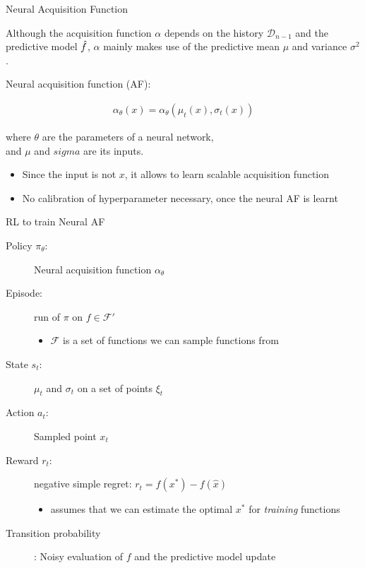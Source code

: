 \begin{frame}[c]{Neural Acquisition Function }

Although the \alert{acquisition function $\alpha$} depends on the history $\mathcal{D}_{n-1}$ and the predictive model $\hat{f}$, $\alpha$ mainly makes use of the \alert{predictive mean $\mu$ and variance $\sigma^2$}.

\pause
\bigskip

Neural acquisition function (AF):

\begin{eqnarray}
\alpha_\theta(x) = \alpha_\theta(\mu_t(x), \sigma_t(x)) \nonumber
\end{eqnarray}

where $\theta$ are the parameters of a neural network,\\ and $\mu$ and $sigma$ are its inputs.

\pause 
\begin{itemize}
\item Since the input is not $x$, it allows to learn scalable acquisition function
\item No calibration of hyperparameter necessary, once the neural AF is learnt
\end{itemize}

\end{frame}
\begin{frame}[c]{RL to train Neural AF }

\begin{description}
\item[Policy $\pi_\theta$:] Neural acquisition function $\alpha_\theta$
\pause
\item[Episode:] run of $\pi$ on $f\in \mathcal{F}'$
\begin{itemize}
\item $\mathcal{F}$ is a set of functions we can sample functions from
\end{itemize}
\pause
\item[State $s_t$:] $\mu_t$ and $\sigma_t$ on a set of points $\xi_t$
\pause
\item[Action $a_t$:] Sampled point $x_t$
\pause
\item[Reward $r_t$:] negative simple regret: $r_t = f(x^*) - f(\hat{x})$
\begin{itemize}
\item assumes that we can estimate the optimal $x^*$ for \emph{training} functions
\end{itemize}
\pause
\item[Transition probability]: Noisy evaluation of $f$ and the predictive model update
\end{description}

\end{frame}
